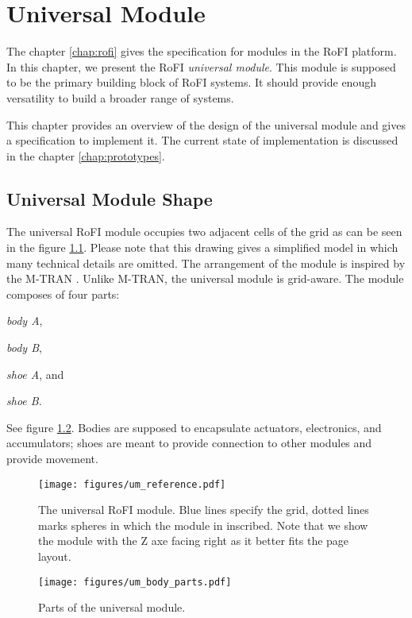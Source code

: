 \chapter{Universal Module}\label{chap:universal_module}

The chapter \ref{chap:rofi} gives the specification for modules in the RoFI
platform. In this chapter, we present the RoFI \emph{universal module}. This
module is supposed to be the primary building block of RoFI systems. It should
provide enough versatility to build a broader range of systems.

This chapter provides an overview of the design of the universal module and
gives a specification to implement it. The current state of implementation is
discussed in the chapter \ref{chap:prototypes}.

\section{Universal Module Shape}

The universal RoFI module occupies two adjacent cells of the grid as can be seen
in the figure \ref{fig:um_reference}. Please note that this drawing gives a
simplified model in which many technical details are omitted. The arrangement of
the module is inspired by the M-TRAN \cite{kurokawa_distributed_2008}. Unlike
M-TRAN, the universal module is grid-aware. The module composes of four parts:
\begin{enumerate*}
    \item \emph{body A},
    \item \emph{body B},
    \item \emph{shoe A}, and
    \item \emph{shoe B}.
\end{enumerate*}
See figure \ref{fig:um_body_parts}. Bodies are supposed to encapsulate
actuators, electronics, and accumulators; shoes are meant to provide connection
to other modules and provide movement.

\begin{figure}[t]
    \centering
    \texttt{[image: figures/um\_reference.pdf]}
    \caption{The universal RoFI module. Blue lines specify the grid, dotted
    lines marks spheres in which the module in inscribed. Note that we show the
    module with the Z axe facing right as it better fits  the page layout. }
    \label{fig:um_reference}
\end{figure}

\begin{figure}[t]
    \centering
    \texttt{[image: figures/um\_body\_parts.pdf]}
    \caption{Parts of the universal module.}
    \label{fig:um_body_parts}
\end{figure}

